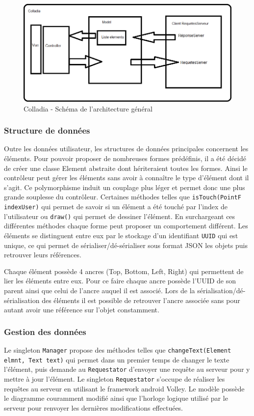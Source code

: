  	\vspace*{\fill}
	\begin{figure}[!h]
		\centering
		\includegraphics[width=.6\textwidth]{img/archiGeneral}
		\caption{Colladia - Schéma de l'architecture général}
	\end{figure}
 	\vspace*{\fill}
	
\newpage
\subsubsection{Structure de données}
Outre les données utilisateur, les structures de données principales concernent les éléments.
Pour pouvoir proposer de nombreuses formes prédéfinis, il a été décidé de créer une classe Element abstraite dont hériteraient toutes les formes.
Ainsi le contrôleur peut gérer les éléments sans avoir à connaître le type d'élément dont il s'agit.
Ce polymorphisme induit un couplage plus léger et permet donc une plus grande souplesse du contrôleur.
Certaines méthodes telles que \lstinline$isTouch(PointF indexUser)$ qui permet de savoir si un élément a été touché par l'index de l'utilisateur ou \lstinline$draw()$ qui permet de dessiner l'élément.
En surchargeant ces différentes méthodes chaque forme peut proposer un comportement différent.
Les éléments se distinguent entre eux par le stockage d'un identifiant \lstinline$UUID$ qui est unique, ce qui permet de sérialiser/dé-sérialiser sous format JSON les objets puis retrouver leurs références.

Chaque élément possède 4 ancres (Top, Bottom, Left, Right) qui permettent de lier les éléments entre eux.
Pour ce faire chaque ancre possède l'UUID de son parent ainsi que celui de l'ancre auquel il est associé.
Lors de la sérialisation/dé-sérialisation des éléments il est possible de retrouver l'ancre associée sans pour autant avoir une référence sur l'objet constamment.

\subsubsection{Gestion des données}
Le singleton \lstinline$Manager$ propose des méthodes telles que \lstinline$changeText(Element elmnt, Text text)$ qui permet dans un premier temps de changer le texte l'élément, puis demande au \lstinline$Requestator$ d'envoyer une requête au serveur pour y mettre à jour l'élément.
Le singleton \lstinline$Requestator$ s'occupe de réaliser les requêtes au serveur en utilisant le framework android Volley.
Le modèle possède le diagramme couramment modifié ainsi que l'horloge logique utilisé par le serveur pour renvoyer les dernières modifications effectuées.

